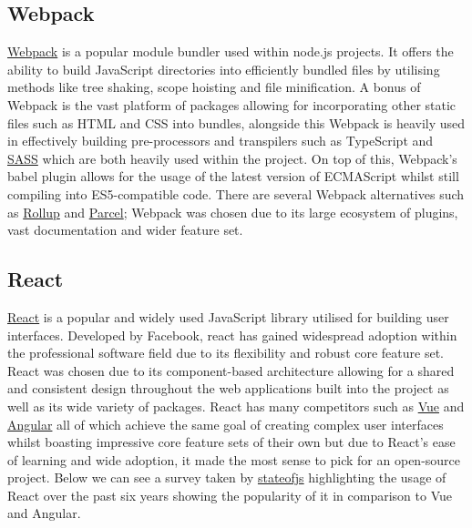 \documentclass{l4proj}
\begin{document}
\subsection{Webpack}
\href{https://webpack.js.org/}{Webpack} \text is a popular module bundler used within node.js projects. It offers the ability to build JavaScript directories into efficiently bundled files by utilising methods like tree shaking, scope hoisting and file minification. A bonus of Webpack is the vast platform of packages allowing for incorporating other static files such as HTML and CSS into bundles, alongside this Webpack is heavily used in effectively building pre-processors and transpilers such as TypeScript and \href{https://sass-lang.com/}{SASS} which are both heavily used within the project. On top of this, Webpack's babel plugin allows for the usage of the latest version of ECMAScript whilst still compiling into ES5-compatible code. There are several Webpack alternatives such as \href{https://rollupjs.org/}{Rollup} and \href{https://parceljs.org/}{Parcel}; Webpack was chosen due to its large ecosystem of plugins, vast documentation and wider feature set. 

\subsection{React}

 \href{https://reactjs.org/}{React} \text is a popular and widely used JavaScript library utilised for building user interfaces. Developed by Facebook, react has gained widespread adoption within the professional software field due to its flexibility and robust core feature set. React was chosen due to its component-based architecture allowing for a shared and consistent design throughout the web applications built into the project as well as its wide variety of packages. React has many competitors such as \href{https://vuejs.org/}{Vue} and \href{https://angular.io/}{Angular} all of which achieve the same goal of creating complex user interfaces whilst boasting impressive core feature sets of their own but due to React's ease of learning and wide adoption, it made the most sense to pick for an open-source project. Below we can see a survey taken by \href{https://2022.stateofjs.com/en-US/libraries/front-end-frameworks/}{stateofjs} highlighting the usage of React over the past six years showing the popularity of it in comparison to Vue and Angular.
\end{document}
